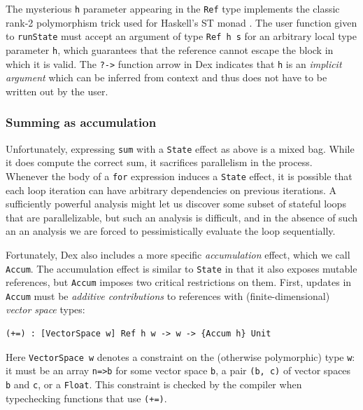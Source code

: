 \documentclass[acmsmall,screen,nonacm]{acmart}
\newlength{\codeindent}
\newcommand{\ttt}[1]{\texttt{#1}}
\newcommand{\codelinesize}{\normalsize}
\begin{document}
The mysterious \texttt{h} parameter appearing in the \texttt{Ref} type implements the classic rank-2 polymorphism trick used for Haskell's ST monad \cite{launchbury1994st}.
The user function given to \texttt{runState} must accept an argument of type \texttt{Ref h s} for an arbitrary local type parameter \texttt{h}, which guarantees that the reference cannot escape the block in which it is valid.
The \texttt{?->} function arrow in Dex indicates that \texttt{h} is an \emph{implicit argument} which can be inferred from context and thus does not have to be written out by the user.

\subsubsection{Summing as accumulation}
\label{sec:sum-via-accum}

Unfortunately, expressing \texttt{sum} with a \ttt{State} effect as above is a mixed bag.
While it does compute the correct sum, it sacrifices parallelism in the process.
Whenever the body of a \texttt{for} expression induces a \texttt{State} effect, it is possible that each loop iteration can have arbitrary dependencies on previous iterations. A sufficiently powerful analysis might let us discover some subset of stateful loops that are parallelizable, but such an analysis is difficult, and in the absence of such an an analysis we are forced to pessimistically evaluate the loop sequentially.

Fortunately, Dex also includes a more specific \emph{accumulation} effect, which we call \texttt{Accum}.
The accumulation effect is similar to \texttt{State} in that it also exposes mutable references, but \ttt{Accum} imposes two critical restrictions on them.
First, updates in \ttt{Accum} must be \emph{additive contributions} to references with (finite-dimensional) \emph{vector space} types:
\begin{Verbatim}[xleftmargin=\codeindent,fontsize=\codelinesize]
(+=) : [VectorSpace w] Ref h w -> w -> {Accum h} Unit
\end{Verbatim}
Here \texttt{VectorSpace w} denotes a constraint on the (otherwise polymorphic) type \texttt{w}: it must be an array \texttt{n=>b} for some vector space \texttt{b}, a pair \texttt{(b, c)} of vector spaces \texttt{b} and \texttt{c}, or a \texttt{Float}. This constraint is checked by the compiler when typechecking functions that use \texttt{(+=)}.
\end{document}
